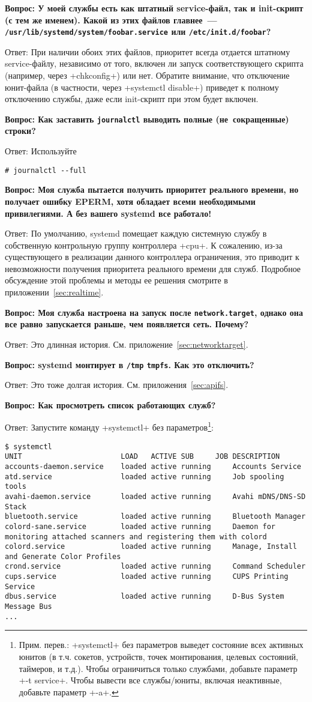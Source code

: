 \documentclass[10pt,oneside,a4paper]{article}
\newcommand{\qna}[1]{\medskip\par\textbf{Вопрос: #1}\par Ответ:}
\begin{document}
\qna{У моей службы есть как штатный service-файл, так и init-скрипт (с тем же
именем). Какой из этих файлов главнее~---
\texttt{/usr/lib/systemd/system/foobar.service} или 
\texttt{/etc/init.d/foobar}?}
При наличии обоих этих файлов, приоритет всегда отдается штатному service-файлу,
независимо от того, включен ли запуск соответствующего скрипта (например, через
+chkconfig+) или нет. Обратите внимание, что отключение юнит-файла (в частности,
через +systemctl disable+) приведет к полному отключению службы, даже если
init-скрипт при этом будет включен.

\qna{Как заставить \texttt{journalctl} выводить полные (не~сокращенные) строки?}
Используйте
\begin{Verbatim}
# journalctl --full
\end{Verbatim}

\qna{Моя служба пытается получить приоритет реального времени, но получает
ошибку EPERM, хотя обладает всеми необходимыми привилегиями. А без вашего
systemd все работало!}
По умолчанию, systemd помещает каждую системную службу в собственную контрольную
группу контроллера +cpu+. К сожалению, из-за существующего в реализации данного
контроллера ограничения, это приводит к невозможности получения приоритета
реального времени для служб. Подробное обсуждение этой проблемы и методы ее
решения смотрите в приложении~\ref{sec:realtime}.

\qna{Моя служба настроена на запуск после \texttt{network.target}, однако она
все равно запускается раньше, чем появляется сеть. Почему?}
Это длинная история. См. приложение~\ref{sec:networktarget}.

\qna{systemd монтирует в \texttt{/tmp} \texttt{tmpfs}. Как это отключить?}
Это тоже долгая история. См. приложения~\ref{sec:apifs}.

\qna{Как просмотреть список работающих служб?}
Запустите команду +systemctl+ без параметров\footnote{Прим. перев.: +systemctl+
без параметров выведет состояние всех активных юнитов (в т.ч. сокетов,
устройств, точек монтирования, целевых состояний, таймеров, и т.д.). Чтобы
ограничиться только службами, добавьте параметр +-t service+. Чтобы вывести все
службы/юниты, включая неактивные, добавьте параметр +-a+.}:
\begin{Verbatim}[fontsize=\small]
$ systemctl
UNIT                       LOAD   ACTIVE SUB     JOB DESCRIPTION
accounts-daemon.service    loaded active running     Accounts Service
atd.service                loaded active running     Job spooling tools
avahi-daemon.service       loaded active running     Avahi mDNS/DNS-SD Stack
bluetooth.service          loaded active running     Bluetooth Manager
colord-sane.service        loaded active running     Daemon for monitoring attached scanners and registering them with colord
colord.service             loaded active running     Manage, Install and Generate Color Profiles
crond.service              loaded active running     Command Scheduler
cups.service               loaded active running     CUPS Printing Service
dbus.service               loaded active running     D-Bus System Message Bus
...
\end{Verbatim}
\end{document}
